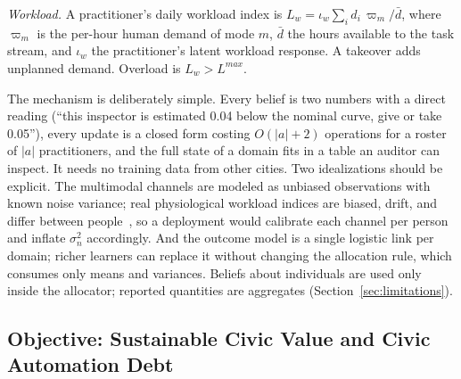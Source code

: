 \documentclass[utf8]{FrontiersinHarvard}
\begin{document}
	\textit{Workload.} A practitioner's daily workload index is $L_w = \iota_w\sum_i d_i\,\varpi_m/\bar d$, where $\varpi_m$ is the per-hour human demand of mode $m$, $\bar d$ the hours available to the task stream, and $\iota_w$ the practitioner's latent workload response. A takeover adds unplanned demand. Overload is $L_w>L^{max}$.

	The mechanism is deliberately simple. Every belief is two numbers with a direct reading (``this inspector is estimated 0.04 below the nominal curve, give or take 0.05''), every update is a closed form costing $O(|a|+2)$ operations for a roster of $|a|$ practitioners, and the full state of a domain fits in a table an auditor can inspect. It needs no training data from other cities. Two idealizations should be explicit. The multimodal channels are modeled as unbiased observations with known noise variance; real physiological workload indices are biased, drift, and differ between people~\citep{Dehais2020,Debie2021}, so a deployment would calibrate each channel per person and inflate $\sigma_n^2$ accordingly. And the outcome model is a single logistic link per domain; richer learners can replace it without changing the allocation rule, which consumes only means and variances. Beliefs about individuals are used only inside the allocator; reported quantities are aggregates (Section~\ref{sec:limitations}).

	\subsection{Objective: Sustainable Civic Value and Civic Automation Debt}
	\label{sec:math}
\end{document}
